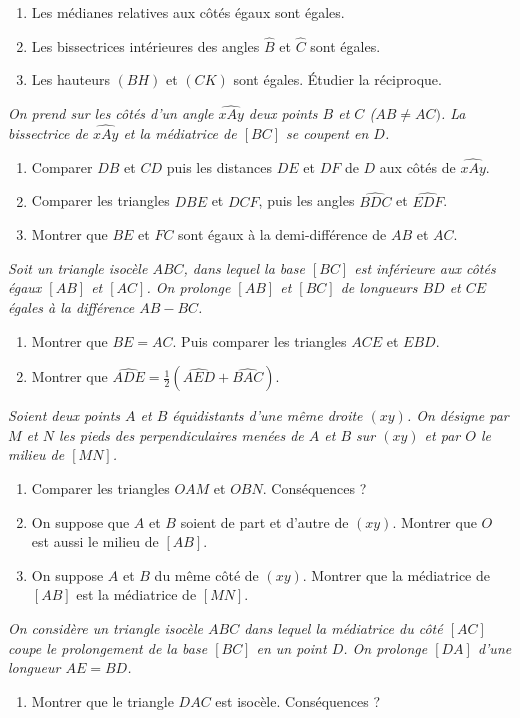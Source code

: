 \begin{itemize}
\begin{enumerate}
\item Les médianes relatives aux côtés égaux sont égales.
\item Les bissectrices intérieures des angles $\widehat{B}$ et $\widehat{C}$ sont égales. 
\item Les hauteurs $(BH)$ et $(CK)$ sont égales. Étudier la réciproque. 
\end{enumerate}
\it On prend sur les côtés d'un angle $\widehat{xAy}$ deux points $B$ et $C$ ($AB\neq AC)$. 
La bissectrice de $\widehat{xAy}$ et la médiatrice de $[BC]$ se coupent en $D$. \begin{enumerate}
\item Comparer $DB$ et $CD$ puis les distances $DE$ et $DF$ de $D$ aux côtés de $\widehat{xAy}$.
\item Comparer les triangles $DBE$ et $DCF$, puis les angles $\widehat{BDC}$ et $\widehat{EDF}$.
\item Montrer que $BE$ et $FC$ sont égaux à la demi-différence de $AB$ et $AC$. 
\end{enumerate}
\it Soit un triangle isocèle $ABC$, dans lequel la base $[BC]$ est inférieure aux côtés égaux $[AB]$ et $[AC]$. 
On prolonge $[AB]$ et $[BC]$ de longueurs $BD$ et $CE$ égales à la différence $AB-BC$. \begin{enumerate}
\item Montrer que $BE=AC$. Puis comparer les triangles $ACE$ et $EBD$.
\item Montrer que $\widehat{ADE}=\frac12\left(\widehat{AED}+\widehat{BAC}\right)$.
\end{enumerate}
\it Soient deux points $A$ et $B$ équidistants d'une même droite $(xy)$. On désigne par $M$ et $N$ les pieds des perpendiculaires menées de $A$ et $B$ sur $(xy)$ et par $O$ le milieu de $[MN]$. \begin{enumerate}
\item Comparer les triangles $OAM$ et $OBN$. Conséquences ? 
\item On suppose que $A$ et $B$ soient de part et d'autre de $(xy)$. Montrer que $O$ est aussi le milieu de $[AB]$.
\item On suppose $A$ et $B$ du même côté de $(xy)$. Montrer que la médiatrice de $[AB]$ est la médiatrice de $[MN]$.
\end{enumerate}
\it On considère un triangle isocèle $ABC$ dans lequel 
la médiatrice du côté $[AC]$ coupe le prolongement de la base $[BC]$ en un point $D$. On prolonge $[DA]$ d'une longueur $AE=BD$.\begin{enumerate}
\item Montrer que le triangle $DAC$ est isocèle. Conséquences ?

\end{enumerate}
\end{itemize}
